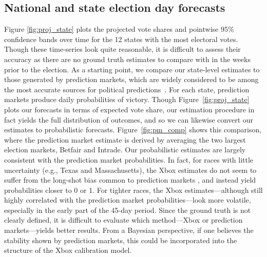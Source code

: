 \documentclass[preprint,authoryear,12pt]{elsarticle}
\begin{document}
\subsection{National and state election day forecasts}
Figure \ref{fig:proj_state} plots the projected vote shares and pointwise 95\%
confidence bands over time for the 12 states with the most electoral votes.
Though these time-series look quite reasonable, it is difficult to assess their
accuracy as there are no ground truth estimates to compare with in the weeks
prior to the election.  As a starting point, we compare our state-level
estimates to those generated by prediction markets, which are widely considered
to be among the most accurate sources for political
predictions~\citep{rothschild2013combining,wolfers2004prediction}.  For each state, prediction
markets produce daily probabilities of victory. Though
Figure~\ref{fig:proj_state} plots our forecasts in terms of expected vote share,
our estimation procedure in fact yields the full distribution of outcomes, and
so we can likewise convert our estimates to probabilistic forecasts.
Figure~\ref{fig:pm_comp} shows this comparison, where the prediction market
estimate is derived by averaging the two largest election markets, Betfair
and Intrade.
Our probabilistic estimates are largely consistent with the prediction market
probabilities. In fact, for races with little uncertainty (e.g., Texas and
Massachusetts), the Xbox estimates do not seem to suffer from the long-shot bias
common to prediction markets \citep{rothschild2009forecasting}, and instead yield probabilities closer
to 0 or 1.  For tighter races, the Xbox estimates---although still highly
correlated with the prediction market probabilities---look more volatile,
especially in the early part of the 45-day period. Since the ground
truth is not clearly defined, it is difficult to evaluate which method---Xbox or
prediction markets---yields better results.  From a Bayesian perspective, if
one believes the stability shown by prediction markets, this could be
incorporated into the structure of the Xbox calibration model.

\end{document}
